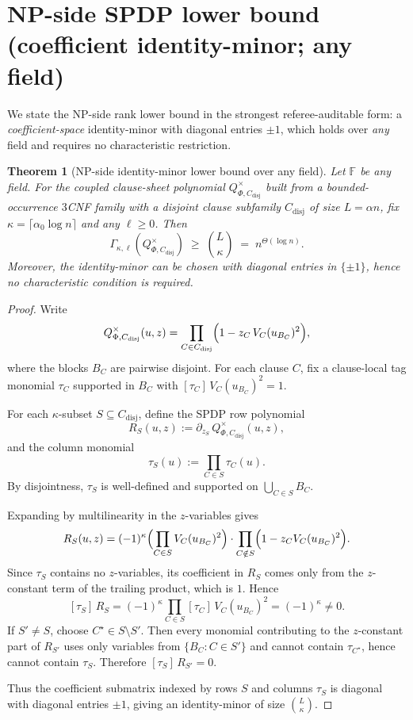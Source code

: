 \documentclass[12pt]{article}
\newtheorem{theorem}{Theorem}
\theoremstyle{definition}
\theoremstyle{definition}
\theoremstyle{remark}
\theoremstyle{remark}
\begin{document}
\section{NP-side SPDP lower bound (coefficient identity-minor; any field)}
\label{sec:np-lowerbound-any-field}

We state the NP-side rank lower bound in the strongest referee-auditable form:
a \emph{coefficient-space} identity-minor with diagonal entries $\pm 1$, which holds over
\emph{any} field and requires no characteristic restriction.

\begin{theorem}[NP-side identity-minor lower bound over any field]
\label{thm:np-identity-minor-any-field}
Let $\mathbb{F}$ be any field.  For the coupled clause-sheet polynomial
$Q^{\times}_{\Phi,C_{\mathrm{disj}}}$ built from a bounded-occurrence $3$CNF family with a
disjoint clause subfamily $C_{\mathrm{disj}}$ of size $L=\alpha n$, fix
$\kappa=\lceil \alpha_0 \log n\rceil$ and any $\ell\ge 0$. Then
\[
\Gamma_{\kappa,\ell}\!\left(Q^{\times}_{\Phi,C_{\mathrm{disj}}}\right)\;\ge\; \binom{L}{\kappa}
\;=\; n^{\Theta(\log n)}.
\]
Moreover, the identity-minor can be chosen with diagonal entries in $\{\pm 1\}$, hence no
characteristic condition is required.
\end{theorem}

\begin{proof}
Write
\[
Q^{\times}_{\Phi,C_{\mathrm{disj}}}(u,z)
= \prod_{C\in C_{\mathrm{disj}}}\Bigl(1 - z_C\,V_C(u_{B_C})^2\Bigr),
\]
where the blocks $B_C$ are pairwise disjoint.  For each clause $C$, fix a clause-local tag
monomial $\tau_C$ supported in $B_C$ with $[\tau_C]\,V_C(u_{B_C})^2=1$.

For each $\kappa$-subset $S\subseteq C_{\mathrm{disj}}$, define the SPDP row polynomial
\[
R_S(u,z):=\partial_{z_S}\,Q^{\times}_{\Phi,C_{\mathrm{disj}}}(u,z),
\]
and the column monomial
\[
\tau_S(u):=\prod_{C\in S}\tau_C(u).
\]
By disjointness, $\tau_S$ is well-defined and supported on $\bigcup_{C\in S}B_C$.

Expanding by multilinearity in the $z$-variables gives
\[
R_S(u,z)=(-1)^\kappa\Bigl(\prod_{C\in S}V_C(u_{B_C})^2\Bigr)\cdot
\prod_{C\notin S}\Bigl(1-z_CV_C(u_{B_C})^2\Bigr).
\]
Since $\tau_S$ contains no $z$-variables, its coefficient in $R_S$ comes only from the
$z$-constant term of the trailing product, which is $1$. Hence
\[
[\tau_S]\,R_S = (-1)^\kappa\prod_{C\in S}[\tau_C]\,V_C(u_{B_C})^2 = (-1)^\kappa\neq 0.
\]
If $S'\neq S$, choose $C^\star\in S\setminus S'$. Then every monomial contributing to
the $z$-constant part of $R_{S'}$ uses only variables from $\{B_C:C\in S'\}$ and cannot
contain $\tau_{C^\star}$, hence cannot contain $\tau_S$. Therefore $[\tau_S]\,R_{S'}=0$.

Thus the coefficient submatrix indexed by rows $S$ and columns $\tau_S$ is diagonal with
diagonal entries $\pm 1$, giving an identity-minor of size $\binom{L}{\kappa}$.
\end{proof}
\end{document}

